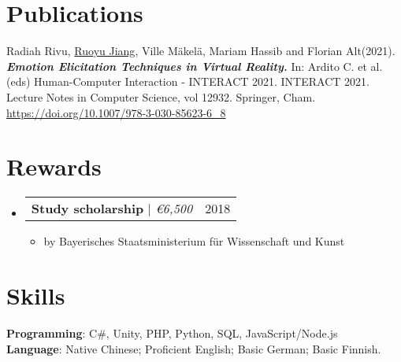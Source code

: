\documentclass[letterpaper,11pt]{article}
\makeatletter
\newcommand{\resumeItem}[1]{
  \item\small{
    {#1 \vspace{-2pt}}
  }
}
\newcommand{\resumeProjectHeading}[2]{
    \item
    \begin{tabular*}{0.97\textwidth}{l@{\extracolsep{\fill}}r}
      \small#1 & #2 \\
    \end{tabular*}\vspace{-7pt}
}
\newcommand{\resumeSubHeadingListStart}{\begin{itemize}[leftmargin=0.15in, label={}]}
\newcommand{\resumeSubHeadingListEnd}{\end{itemize}}
\newcommand{\resumeItemListStart}{\begin{itemize}}
\newcommand{\resumeItemListEnd}{\end{itemize}\vspace{-5pt}}
\makeatother
\begin{document}
  
\section{Publications}
Radiah Rivu, \underline{Ruoyu Jiang}, Ville Mäkelä, Mariam Hassib and Florian Alt(2021). \textbf{\textit{Emotion Elicitation Techniques in Virtual Reality.}} In: Ardito C. et al. (eds) Human-Computer Interaction - INTERACT 2021. INTERACT 2021. Lecture Notes in Computer Science, vol 12932. Springer, Cham. \url{https://doi.org/10.1007/978-3-030-85623-6_8}

  
\section{Rewards}
    \resumeSubHeadingListStart
      \resumeProjectHeading
          {\textbf{Study scholarship} $|$ \emph{\euro 6,500}}{2018}
          \resumeItemListStart
            \resumeItem{by Bayerisches Staatsministerium für Wissenschaft und Kunst}
          \resumeItemListEnd
    \resumeSubHeadingListEnd

\section{Skills}
 \begin{itemize}[leftmargin=0.15in, label={}]
    \small{\item{
     \textbf{Programming}{: C\#, Unity, PHP, Python, SQL, JavaScript/Node.js } \\
     \textbf{Language}{: Native Chinese; Proficient English; Basic German; Basic Finnish.}
    }}
 \end{itemize}

\end{document}
